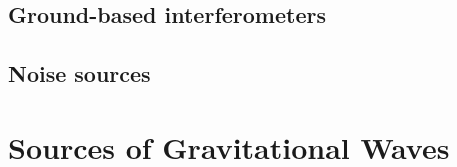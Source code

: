 \documentclass[openleft]{kentigern}
\theoremstyle{definition}
\begin{document}





 \section{Ground-based interferometers}
 \label{sec:ground-based-interf}
 







 \section{Noise sources}
 \label{sec:an-overview-noise}
 


 \chapter{Sources of Gravitational Waves}
 \label{cha:sourc-grav-waves}
\end{document}

